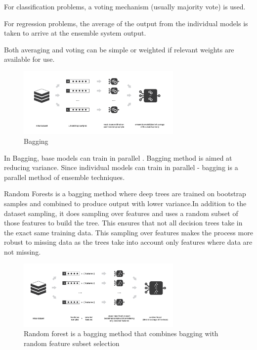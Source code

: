 \documentclass{article}
\begin{document}
For classification problems, a voting mechanism (usually majority vote) is used. 

For regression problems, the average of the output from the individual models is taken to arrive at the ensemble system output.

Both averaging and voting can be simple or weighted if relevant weights are available for use. 



\begin{figure}[H]
    \centering
    \includegraphics[width=8cm]{report-imgs/bagging.png}
    \caption{Bagging}
    \label{bagging}
\end{figure}

In Bagging, base models can train in parallel \cite{rocca_2021}. Bagging method is aimed at reducing variance. Since individual models can train in parallel - bagging is a parallel method of ensemble techniques.


Random Forests is a bagging method where deep trees are trained on bootstrap samples and combined to produce output with lower variance.In addition to the dataset sampling, it does sampling over features and uses a random subset of those features to build the tree. This ensures that not all decision trees take in the exact same training data. This sampling over features makes the process more robust to missing data as the trees take into account only features where data are not missing.

\begin{figure}[H]
    \centering
    \includegraphics[width=8cm]{report-imgs/random-forest.png}
    \caption{Random forest is a bagging method that combines bagging with random feature subset selection}
    \label{randomForest}
\end{figure}
\end{document}
